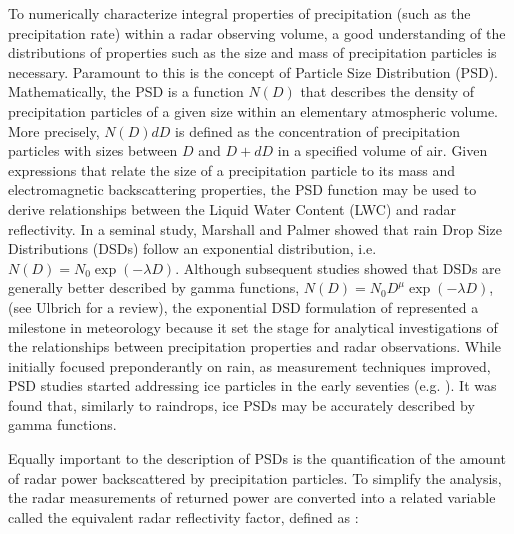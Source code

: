 \documentclass[10pt]{ietbook}
\begin{document}
To numerically characterize integral properties of precipitation (such as the precipitation rate) within a radar observing volume, a good understanding of the 
distributions of properties such as the size and mass of precipitation particles is necessary.
Paramount to this is the concept of Particle Size Distribution (PSD).  Mathematically, the PSD is a function $N(D)$ that describes the density of precipitation particles of
a given size within an elementary atmospheric volume.  More precisely, $N(D)dD$ is defined as the concentration of precipitation particles with sizes between $D$ and $D+dD$
in a specified volume of air.  Given expressions that relate the size of a precipitation particle to its mass and electromagnetic backscattering
properties, the PSD function may be used to derive relationships between the Liquid Water Content (LWC) and radar reflectivity.  In a seminal
study, Marshall and Palmer  \cite{marshall_palmer_1948} showed that rain Drop Size Distributions (DSDs) follow an exponential distribution,
i.e. $N(D)=N_0\exp(-\lambda D)$.  Although subsequent studies showed that DSDs are generally better described by gamma functions,
$N(D)=N_0 D^{\mu}\exp(-\lambda D)$, (see Ulbrich 
\cite{ulbrich1983} for a review), the exponential DSD formulation of \cite{marshall_palmer_1948} represented a milestone in meteorology because
it set the stage for analytical investigations of the relationships between precipitation properties and radar observations.  While initially
focused preponderantly on rain, as measurement techniques improved, PSD studies started addressing ice particles in the early seventies 
(e.g. \cite{ssrivastava1970,heymsfield_a1977}). It was found that, similarly to raindrops, ice PSDs may be accurately described by gamma functions.

Equally important to the description of PSDs is the quantification of the amount of radar power backscattered by precipitation particles. 
To simplify the analysis, the radar measurements of returned power are converted into a related variable called the equivalent 
radar reflectivity factor, defined as \cite{meneghini1990}:
\end{document}
